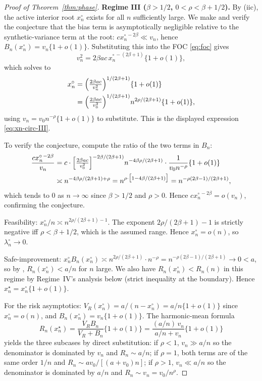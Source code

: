 \begin{proof}[Proof of Theorem~\ref{thm:phase}]
\medskip
\noindent\textbf{Regime III ($\beta > 1/2$, $0 < \rho < \beta + 1/2$).} By (iic), the active interior root $x_n^\circ$ exists for all $n$ sufficiently large. We make and verify the conjecture that the bias term is asymptotically negligible relative to the synthetic-variance term at the root: $c x_n^{\circ\, -2\beta} \ll v_n$, hence $B_n(x_n^\circ) = v_n\{1 + o(1)\}$. Substituting this into the FOC \cref{eq:foc} gives
\[
v_n^2 = 2\beta a c\, x_n^{\circ\, -(2\beta+1)}\{1+o(1)\},
\]
which solves to
\begin{align*}
x_n^\circ
&= \Bigl(\tfrac{2\beta a c}{v_n^2}\Bigr)^{1/(2\beta+1)}\{1+o(1)\} \\
&= \Bigl(\tfrac{2\beta a c}{v_0^2}\Bigr)^{1/(2\beta+1)}
   n^{2\rho/(2\beta+1)}\{1+o(1)\},
\end{align*}
using $v_n = v_0 n^{-\rho}\{1+o(1)\}$ to substitute. This is the displayed expression \cref{eq:xn-circ-III}.

To verify the conjecture, compute the ratio of the two terms in $B_n$:
\begin{align*}
\frac{c x_n^{\circ\, -2\beta}}{v_n}
&= c \cdot \Bigl[\tfrac{2\beta a c}{v_0^2}\Bigr]^{-2\beta/(2\beta+1)}
   n^{-4\beta\rho/(2\beta+1)} \cdot \frac{1}{v_0 n^{-\rho}}\{1+o(1)\} \\
&\asymp n^{-4\beta\rho/(2\beta+1) + \rho}
= n^{\rho \cdot \bigl[1 - 4\beta/(2\beta+1)\bigr]}
= n^{-\rho(2\beta-1)/(2\beta+1)},
\end{align*}
which tends to $0$ as $n \to \infty$ since $\beta > 1/2$ and $\rho > 0$. Hence $c x_n^{\circ\, -2\beta} = o(v_n)$, confirming the conjecture.

Feasibility: $x_n^\circ / n \asymp n^{2\rho/(2\beta+1) - 1}$. The exponent $2\rho/(2\beta+1) - 1$ is strictly negative iff $\rho < \beta + 1/2$, which is the assumed range. Hence $x_n^\circ = o(n)$, so $\lambda_n^\circ \to 0$.

Safe-improvement: $x_n^\circ B_n(x_n^\circ) \asymp n^{2\rho/(2\beta+1)} \cdot n^{-\rho} = n^{-\rho(2\beta-1)/(2\beta+1)} \to 0 < a$, so by , $R_n(x_n^\circ) < a/n$ for $n$ large. We also have $R_n(x_n^\circ) < R_n(n)$ in this regime by Regime~IV's analysis below (strict inequality at the boundary). Hence $x_n^\star = x_n^\circ\{1+o(1)\}$.

For the risk asymptotics: $V_R(x_n^\circ) = a/(n - x_n^\circ) = a/n\{1+o(1)\}$ since $x_n^\circ = o(n)$, and $B_n(x_n^\circ) = v_n\{1+o(1)\}$. The harmonic-mean formula
\[
R_n(x_n^\star) = \frac{V_R B_n}{V_R + B_n}\{1+o(1)\}
              = \frac{(a/n)\, v_n}{a/n + v_n}\{1+o(1)\}
\]
yields the three subcases by direct substitution: if $\rho < 1$, $v_n \gg a/n$ so the denominator is dominated by $v_n$ and $R_n \sim a/n$; if $\rho = 1$, both terms are of the same order $1/n$ and $R_n \sim a v_0 / [(a + v_0) n]$; if $\rho > 1$, $v_n \ll a/n$ so the denominator is dominated by $a/n$ and $R_n \sim v_n = v_0/n^\rho$.


\end{proof}

